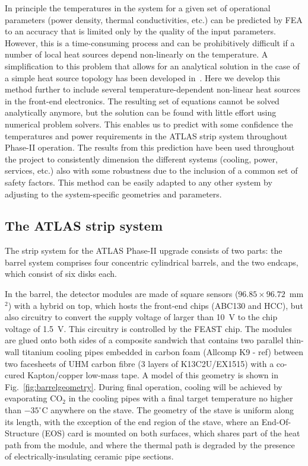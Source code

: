 In principle the temperatures in the system for a given set of operational parameters (power density, thermal conductivities, etc.) can be predicted by FEA to an accuracy that is limited only by the quality of the input parameters. However, this is a time-consuming process and can be prohibitively difficult if a number of local heat sources depend non-linearly on the temperature. A simplification to this problem that allows for an analytical solution in the case of a simple heat source topology has been developed in~\cite{Beck:2010zzd}. Here we develop this method further to include several temperature-dependent non-linear heat sources in the front-end electronics. The resulting set of equations cannot be solved analytically anymore, but the solution can be found with little effort using numerical problem solvers. This enables us to predict with some confidence the temperatures and power requirements in the ATLAS strip system throughout Phase-II operation. The results from this prediction have been used throughout the project to consistently dimension the different systems (cooling, power, services, etc.) also with some robustness due to the inclusion of a common set of safety factors. This method can be easily adapted to any other system by adjusting to the system-specific geometries and parameters.

\subsection{The ATLAS strip system}
The strip system for the ATLAS Phase-II upgrade \cite{Collaboration:2017mtb} consists of two parts: the barrel system comprises four concentric cylindrical barrels, and the two endcaps, which consist of six disks each.

In the barrel, the detector modules are made of square sensors ($96.85\times 96.72$~mm$^2$) with a hybrid on top, which hosts the front-end chips (ABC130 and HCC), but also circuitry to convert the supply voltage of larger than 10~V to the chip voltage of 1.5~V. This circuitry is controlled by the FEAST chip. The modules are glued onto both sides of a composite sandwich that contains two parallel thin-wall titanium cooling pipes embedded in carbon foam (Allcomp K9 - ref)  between two facesheets of UHM carbon fibre (3 layers of K13C2U/EX1515) with a co-cured Kapton/copper low-mass tape. A model of this geometry is shown in Fig.~\ref{fig:barrelgeometry}. During final operation, cooling will be achieved by evaporating CO$_2$ in the cooling pipes with a final target temperature no higher than $-35^\circ$C anywhere on the stave. The geometry of the stave is uniform along its length, with the exception of the end region of the stave, where an End-Of-Structure (EOS) card is mounted on both surfaces, which shares part of the heat path from the module, and where the thermal path is degraded by the presence of electrically-insulating ceramic pipe sections. 

